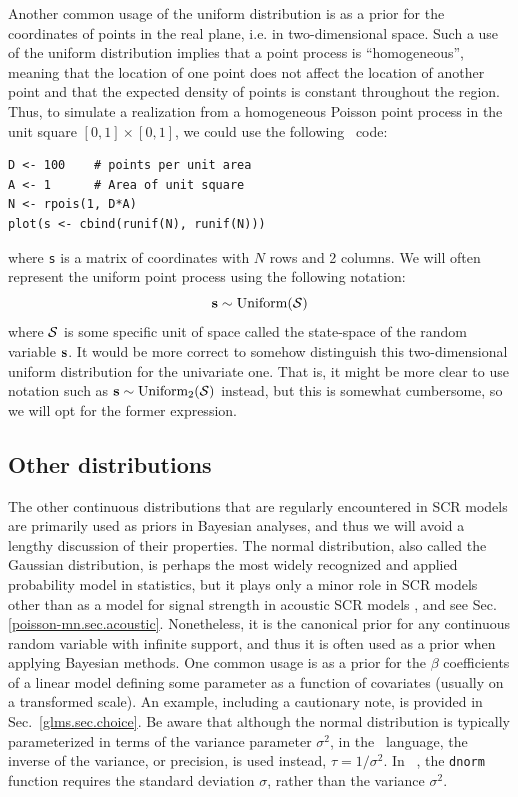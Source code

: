 Another common usage of the uniform distribution is as a prior for the
coordinates of points in the real plane, i.e. in two-dimensional
space. Such a use of the uniform distribution implies that a point process is
``homogeneous'', meaning that the location of one point does not
affect the location of another point and that the expected density of
points is constant throughout the region. Thus, to simulate a
realization from a homogeneous Poisson point process in the unit square
$[0,1] \times [0,1]$, we could use the following \R~code:
\begin{verbatim}
D <- 100    # points per unit area
A <- 1      # Area of unit square
N <- rpois(1, D*A)
plot(s <- cbind(runif(N), runif(N)))
\end{verbatim}
where \verb+s+ is a matrix of coordinates with $N$ rows and 2 columns. We
will often represent the uniform point process using the following notation:
\begin{equation}
  {\bf s} \sim \text{Uniform}(\mathcal{S})
\end{equation}
where ${\cal S}$ is some specific unit of space called the state-space
of the random variable ${\bf s}$.
It would be more correct to somehow distinguish this
two-dimensional uniform distribution for the univariate one. That is,
it might be more clear to use notation such as
${\bf s} \sim \text{Uniform}_2(\mathcal{S})$ instead, but this is somewhat
cumbersome, so we will opt for the former expression.



\subsection{Other distributions}

The other continuous distributions that are regularly encountered in SCR
models are
primarily used as priors in Bayesian analyses, and thus we will avoid
a lengthy discussion of their properties.
The normal distribution, also called the Gaussian
distribution, is perhaps the most widely recognized and applied probability model in
statistics, but it plays only a minor role in SCR models other than as
a model for signal strength in acoustic SCR models
\citep{efford_etal:2009ecol,dawson_efford:2009}, and see
Sec. \ref{poisson-mn.sec.acoustic}.
Nonetheless, it
is the canonical prior for any continuous random variable with
infinite support, and thus it is often used as a prior when applying Bayesian
methods. One common usage is as a prior for the $\beta$
coefficients of a linear model defining some parameter as a function
of covariates (usually on a transformed scale). An example, including a
cautionary note, is provided in Sec.~\ref{glms.sec.choice}.
Be aware that although the normal distribution is typically
parameterized in terms of the variance parameter $\sigma^2$, in
the \bugs~language, the inverse of the variance, or precision, is used
instead, $\tau = 1/\sigma^2$. In ~\R, the \texttt{dnorm} function
requires the standard deviation $\sigma$, rather than the variance
$\sigma^2$.

